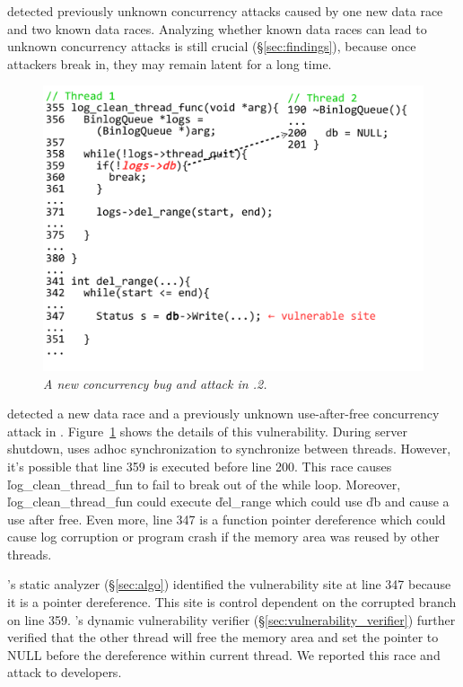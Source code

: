 \xxx detected \nunknownVul previously unknown concurrency attacks caused by 
one new data race and two known data races. Analyzing whether known data races 
can lead to unknown concurrency attacks is still crucial (\S\ref{sec:findings}), 
because once attackers break in, they may remain latent for a long time.


\begin{figure}[h]
\centering
\includegraphics[width=0.9\columnwidth]{figures/ssdb}
\vspace{-.25in}
\caption{{\em A new concurrency bug and attack in .2.}} 
\label{fig:ssdb}
\vspace{-.2in}
\end{figure}

\xxx detected a new data race and a previously unknown use-after-free 
concurrency attack in \ssdb. Figure~\ref{fig:ssdb} shows the details of 
this vulnerability. During server shutdown, \ssdb uses adhoc synchronization to 
synchronize between threads. However, it's possible that line 359 is executed 
before line 200. This race causes \v{log\_clean\_thread\_fun} to fail to break 
out of the while loop. Moreover, \v{log\_clean\_thread\_fun} could execute 
\v{del\_range} which could use \v{db} and cause a use after free. Even 
more, line 347 is a function pointer dereference which could cause log 
corruption or program crash if the memory area was reused by other threads.

\xxx's static analyzer (\S\ref{sec:algo}) identified the vulnerability site at 
line 347 because it is a pointer dereference. This site is 
control dependent on the corrupted branch on line 359. \xxx's dynamic 
vulnerability verifier (\S\ref{sec:vulnerability_verifier}) further verified 
that the other thread will free the memory area and set the pointer to NULL 
before the dereference within current thread. We reported this race and attack 
to \ssdb developers.


